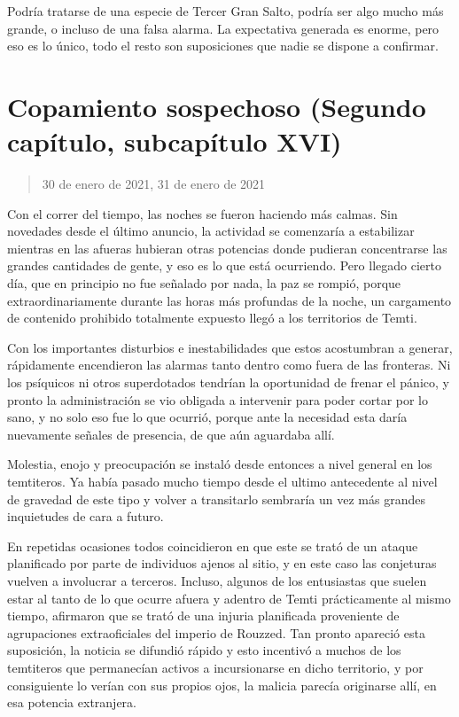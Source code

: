 \documentclass[
  spanish,
]{book}
\begin{document}
Podría tratarse de una especie de Tercer Gran Salto, podría ser algo mucho más grande, o incluso de una falsa alarma. La expectativa generada es enorme, pero eso es lo único, todo el resto son suposiciones que nadie se dispone a confirmar.

\hypertarget{copamiento-sospechoso-segundo-capuxedtulo-subcapuxedtulo-xvi}{%
\section{Copamiento sospechoso (Segundo capítulo, subcapítulo XVI)}\label{copamiento-sospechoso-segundo-capuxedtulo-subcapuxedtulo-xvi}}

\begin{quote}
30 de enero de 2021, 31 de enero de 2021
\end{quote}

Con el correr del tiempo, las noches se fueron haciendo más calmas.
Sin novedades desde el último anuncio, la actividad se comenzaría a estabilizar mientras en las afueras hubieran otras potencias donde pudieran concentrarse las grandes cantidades de gente, y eso es lo que está ocurriendo. Pero llegado cierto día, que en principio no fue señalado por nada, la paz se rompió, porque extraordinariamente durante las horas más profundas de la noche, un cargamento de contenido prohibido totalmente expuesto llegó a los territorios de Temti.

Con los importantes disturbios e inestabilidades que estos acostumbran a generar, rápidamente encendieron las alarmas tanto dentro como fuera de las fronteras. Ni los psíquicos ni otros superdotados tendrían la oportunidad de frenar el pánico, y pronto la administración se vio obligada a intervenir para poder cortar por lo sano, y no solo eso fue lo que ocurrió, porque ante la necesidad esta daría nuevamente señales de presencia, de que aún aguardaba allí.

Molestia, enojo y preocupación se instaló desde entonces a nivel general en los temtiteros. Ya había pasado mucho tiempo desde el ultimo antecedente al nivel de gravedad de este tipo y volver a transitarlo sembraría un vez más grandes inquietudes de cara a futuro.

En repetidas ocasiones todos coincidieron en que este se trató de un ataque planificado por parte de individuos ajenos al sitio, y en este caso las conjeturas vuelven a involucrar a terceros. Incluso, algunos de los entusiastas que suelen estar al tanto de lo que ocurre afuera y adentro de Temti prácticamente al mismo tiempo, afirmaron que se trató de una injuria planificada proveniente de agrupaciones extraoficiales del imperio de Rouzzed.
Tan pronto apareció esta suposición, la noticia se difundió rápido y esto incentivó a muchos de los temtiteros que permanecían activos a incursionarse en dicho territorio, y por consiguiente lo verían con sus propios ojos, la malicia parecía originarse allí, en esa potencia extranjera.
\end{document}
